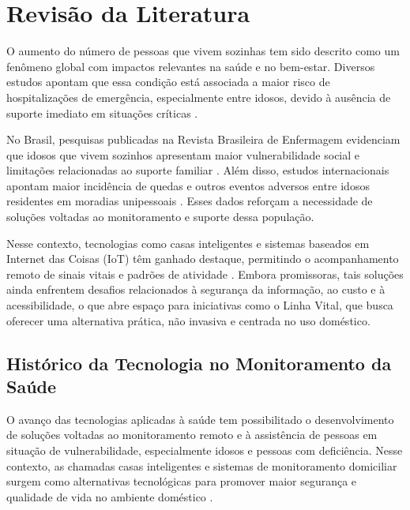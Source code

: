 \chapter{Revisão da Literatura}

O aumento do número de pessoas que vivem sozinhas tem sido descrito como um fenômeno global com impactos relevantes na saúde e no bem-estar. Diversos estudos apontam que essa condição está associada a maior risco de hospitalizações de emergência, especialmente entre idosos, devido à ausência de suporte imediato em situações críticas \cite{kandler2017}.

No Brasil, pesquisas publicadas na Revista Brasileira de Enfermagem evidenciam que idosos que vivem sozinhos apresentam maior vulnerabilidade social e limitações relacionadas ao suporte familiar \cite{perseguino2017}. Além disso, estudos internacionais apontam maior incidência de quedas e outros eventos adversos entre idosos residentes em moradias unipessoais \cite{nakamura2017}. Esses dados reforçam a necessidade de soluções voltadas ao monitoramento e suporte dessa população.

Nesse contexto, tecnologias como casas inteligentes e sistemas baseados em Internet das Coisas (IoT) têm ganhado destaque, permitindo o acompanhamento remoto de sinais vitais e padrões de atividade \cite{smarthomehealth2019,predictivehealthcare2020}. Embora promissoras, tais soluções ainda enfrentem desafios relacionados à segurança da informação, ao custo e à acessibilidade, o que abre espaço para iniciativas como o Linha Vital, que busca oferecer uma alternativa prática, não invasiva e centrada no uso doméstico.

\section{Histórico da Tecnologia no Monitoramento da Saúde}

O avanço das tecnologias aplicadas à saúde tem possibilitado o desenvolvimento de soluções voltadas ao monitoramento remoto e à assistência de pessoas em situação de vulnerabilidade, especialmente idosos e pessoas com deficiência. Nesse contexto, as chamadas casas inteligentes e sistemas de monitoramento domiciliar surgem como alternativas tecnológicas para promover maior segurança e qualidade de vida no ambiente doméstico \cite{smartliving2018,ambientassistedliving2016}.

